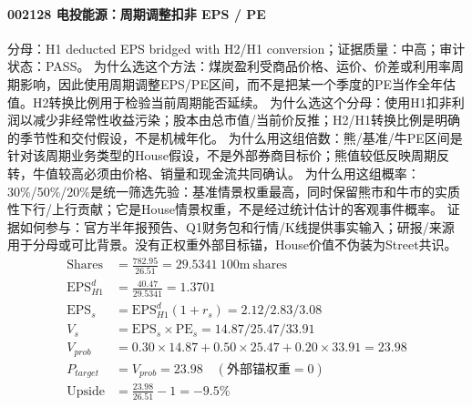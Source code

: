 \paragraph{002128 电投能源：周期调整扣非 EPS / PE}
分母：H1 deducted EPS bridged with H2/H1 conversion；证据质量：中高；审计状态：PASS。
为什么选这个方法：煤炭盈利受商品价格、运价、价差或利用率周期影响，因此使用周期调整EPS/PE区间，而不是把某一个季度的PE当作全年估值。H2转换比例用于检验当前周期能否延续。
为什么选这个分母：使用H1扣非利润以减少非经常性收益污染；股本由总市值/当前价反推；H2/H1转换比例是明确的季节性和交付假设，不是机械年化。
为什么用这组倍数：熊/基准/牛PE区间是针对该周期业务类型的House假设，不是外部券商目标价；熊值较低反映周期反转，牛值较高必须由价格、销量和现金流共同确认。
为什么用这组概率：30\%/50\%/20\%是统一筛选先验：基准情景权重最高，同时保留熊市和牛市的实质性下行/上行贡献；它是House情景权重，不是经过统计估计的客观事件概率。
证据如何参与：官方半年报预告、Q1财务包和行情/K线提供事实输入；研报/来源用于分母或可比背景。没有正权重外部目标锚，House价值不伪装为Street共识。
\begin{align*}
\mathrm{Shares} &= \frac{782.95}{26.51}=29.5341\ \mathrm{100m\ shares}\\
\mathrm{EPS}_{H1}^d &= \frac{40.47}{29.5341}=1.3701\\
\mathrm{EPS}_s &= \mathrm{EPS}_{H1}^d(1+r_s)=2.12/2.83/3.08\\
V_s &= \mathrm{EPS}_s\times \mathrm{PE}_s=14.87/25.47/33.91\\
V_{prob} &= 0.30\times 14.87+0.50\times 25.47+0.20\times 33.91=23.98\\
P_{target} &= V_{prob}=23.98\quad(\text{外部锚权重}=0)\\
\mathrm{Upside} &= \frac{23.98}{26.51}-1=-9.5\%\\
\end{align*}

